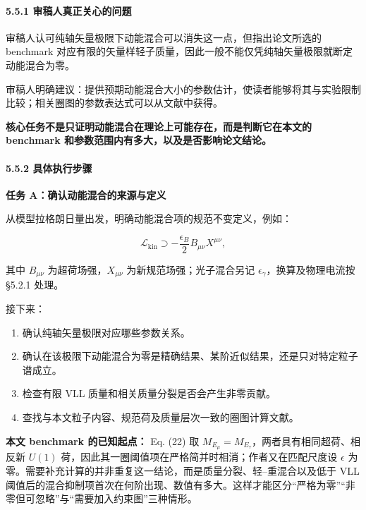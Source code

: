 \documentclass[
]{article}
\providecommand{\tightlist}{%
  \setlength{\itemsep}{0pt}\setlength{\parskip}{0pt}}
\begin{document}
\paragraph{5.5.1
审稿人真正关心的问题}\label{ux5ba1ux7a3fux4ebaux771fux6b63ux5173ux5fc3ux7684ux95eeux9898-1}

审稿人认可纯轴矢量极限下动能混合可以消失这一点，但指出论文所选的
benchmark
对应有限的矢量样轻子质量，因此一般不能仅凭纯轴矢量极限就断定动能混合为零。

审稿人明确建议：提供预期动能混合大小的参数估计，使读者能够将其与实验限制比较；相关圈图的参数表达式可以从文献中获得。

\textbf{核心任务不是只证明动能混合在理论上可能存在，而是判断它在本文的
benchmark 和参数范围内有多大，以及是否影响论文结论。}

\paragraph{5.5.2
具体执行步骤}\label{ux5177ux4f53ux6267ux884cux6b65ux9aa4-1}

\textbf{任务 A：确认动能混合的来源与定义}

从模型拉格朗日量出发，明确动能混合项的规范不变定义，例如：

\[
\mathcal L_{\mathrm{kin}}
\supset
-\frac{\epsilon_B}{2}B_{\mu\nu}X^{\mu\nu},
\]

其中 \(B_{\mu\nu}\) 为超荷场强，\(X_{\mu\nu}\)
为新规范场强；光子混合另记 \(\epsilon_\gamma\)，换算及物理电流按 §5.2.1
处理。

接下来：

\begin{enumerate}
\def\labelenumi{\arabic{enumi}.}
\tightlist
\item
  确认纯轴矢量极限对应哪些参数关系。
\item
  确认在该极限下动能混合为零是精确结果、某阶近似结果，还是只对特定粒子谱成立。
\item
  检查有限 VLL 质量和相关质量分裂是否会产生非零贡献。
\item
  查找与本文粒子内容、规范荷及质量层次一致的圈图计算文献。
\end{enumerate}

\textbf{本文 benchmark 的已知起点：} Eq. (22) 取
\(M_{E_\mu}=M_{E_\tau}\)，两者具有相同超荷、相反新 \(U(1)\)
荷，因此其一圈阈值项在严格简并时相消；作者又在匹配尺度设 \(\epsilon\)
为零。需要补充计算的并非重复这一结论，而是质量分裂、轻--重混合以及低于
VLL
阈值后的混合抑制项首次在何阶出现、数值有多大。这样才能区分``严格为零''``非零但可忽略''与``需要加入约束图''三种情形。
\end{document}
